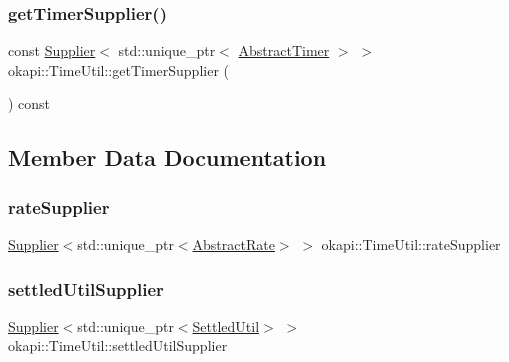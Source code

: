 \mbox{\label{classokapi_1_1TimeUtil_a4d5e56d45f13162ac4b08ff689883315}} 
\subsubsection{\texorpdfstring{getTimerSupplier()}{getTimerSupplier()}}
{\footnotesize\ttfamily const \mbox{\hyperlink{classokapi_1_1Supplier}{Supplier}}$<$ std\+::unique\+\_\+ptr$<$ \mbox{\hyperlink{classokapi_1_1AbstractTimer}{Abstract\+Timer}} $>$ $>$ okapi\+::\+Time\+Util\+::get\+Timer\+Supplier (\begin{DoxyParamCaption}{ }\end{DoxyParamCaption}) const}



\subsection{Member Data Documentation}
\mbox{\label{classokapi_1_1TimeUtil_afdd2a5ab8f268868daf26ecd74580983}} 
\subsubsection{\texorpdfstring{rateSupplier}{rateSupplier}}
{\footnotesize\ttfamily \mbox{\hyperlink{classokapi_1_1Supplier}{Supplier}}$<$std\+::unique\+\_\+ptr$<$\mbox{\hyperlink{classokapi_1_1AbstractRate}{Abstract\+Rate}}$>$ $>$ okapi\+::\+Time\+Util\+::rate\+Supplier\hspace{0.3cm}{\ttfamily [protected]}}

\mbox{\label{classokapi_1_1TimeUtil_aab5bc0e4f9c14b511c53211f2374fa1b}} 
\subsubsection{\texorpdfstring{settledUtilSupplier}{settledUtilSupplier}}
{\footnotesize\ttfamily \mbox{\hyperlink{classokapi_1_1Supplier}{Supplier}}$<$std\+::unique\+\_\+ptr$<$\mbox{\hyperlink{classokapi_1_1SettledUtil}{Settled\+Util}}$>$ $>$ okapi\+::\+Time\+Util\+::settled\+Util\+Supplier\hspace{0.3cm}{\ttfamily [protected]}}

